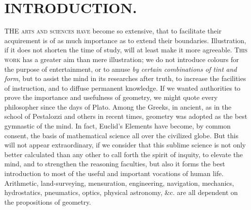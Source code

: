     \chapter{INTRODUCTION.}
    \lettrine[lines=2]{T}{HE arts and sciences have} become so extensive,
    that to facilitate their acquirement is of as much importance as to
    extend their boundaries. Illustration, if it does not shorten the time
    of study, will at least make it more agreeable. \textsc{This work} has
    a greater aim than mere illustration; we do not introduce colours for
    the purpose of entertainment, or to amuse \textit{by certain
    combinations of tint and form}, but to assist the mind in its
    researches after truth, to increase the facilities of instruction, and
    to diffuse permanent knowledge. If we wanted authorities to prove the
    importance and usefulness of geometry, we might quote every
    philosopher since the days of Plato. Among the Greeks, in ancient, as
    in the school of Pestalozzi and others in recent times, geometry was
    adopted as the best gymnastic of the mind. In fact, Euclid's Elements
    have become, by common consent, the basis of mathematical science all
    over the civilized globe. But this will not appear extraordinary, if
    we consider that this sublime science is not only better calculated
    than any other to call forth the spirit of inquity, to elevate the
    mind, and to strengthen the reasoning faculties, but also it forms the
    best introduction to most of the useful and important vocations of
    human life. Arithmetic, land-surveying, mensuration, engineering,
    navigation, mechanics, hydrostatics, pneumatics, optics, physical
    astronomy, \&c. are all dependent on the propositions of geometry. 

